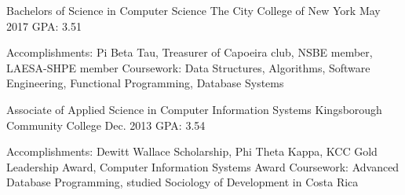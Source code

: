 \begin{cventries}
\iftrue
  \cventry
    {Bachelors of Science in Computer Science} %
    {The City College of New York} %
    {May 2017} %
    {GPA: 3.51} %
	{
	  	  \begin{cvskills} %
		\cvskill
		  {Accomplishments:} %
		  {Pi Beta Tau, Treasurer of Capoeira club, NSBE member, LAESA-SHPE
		  member} %
		\cvskill
		  {Coursework:} %
		  {Data Structures, Algorithms, Software Engineering, Functional Programming, Database Systems} %
	  \end{cvskills}
	} %
\fi
\iftrue
  \cventry
    {Associate of Applied Science in Computer Information Systems} %
    {Kingsborough Community College} %
    {Dec. 2013} %
    {GPA: 3.54} %
    {
	  \begin{cvskills} %
		\cvskill
		  {Accomplishments:} %
		  {Dewitt Wallace Scholarship, Phi Theta Kappa, KCC Gold Leadership Award, Computer Information Systems Award} %
		\cvskill
		  {Coursework:} %
		  {Advanced Database Programming, studied Sociology of Development in Costa Rica} %
	  \end{cvskills}
	}
\fi
\iffalse
  \cventry
    {Associate of Occupational Studies in Computer Programming} %
    {Wood Tobe-Coburn School} %
    {Aug. 2008} %
    {GPA: 3.6} %
    {
	  \begin{cvskills} %
		\cvskill
		  {Coursework:} %
		  {Visual Basic for Applications, Server Administration} %
	  \end{cvskills}
	}
\fi
\end{cventries}
